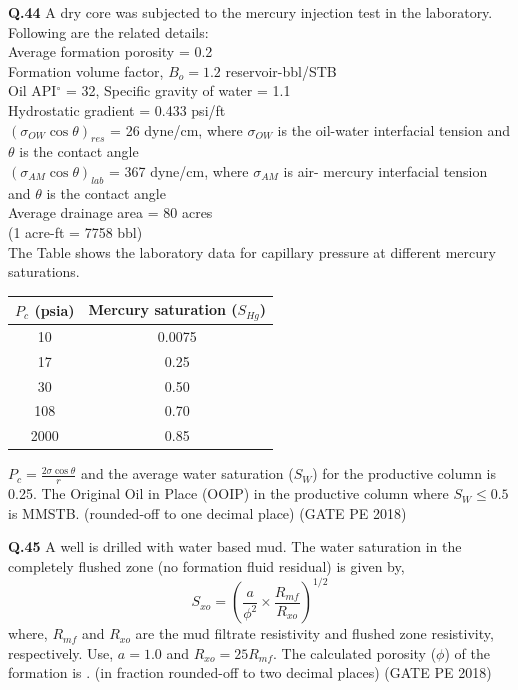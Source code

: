 \documentclass[journal,12pt,onecolumn]{IEEEtran}
\theoremstyle{remark}
\begin{document}
\noindent\textbf{Q.44} A dry core was subjected to the mercury injection test in the laboratory. Following are the related details: \\ 
Average formation porosity = 0.2 \\ 
Formation volume factor, $B_o = 1.2$ reservoir-bbl/STB \\ 
Oil API$^\circ$ = 32, Specific gravity of water = 1.1 \\ 
Hydrostatic gradient = 0.433 psi/ft \\ 
$(\sigma_{OW} \cos \theta)_{res}$ = 26 dyne/cm, where $\sigma_{OW}$ is the oil-water interfacial tension and $\theta$ is the contact angle \\ 
$(\sigma_{AM} \cos \theta)_{lab}$ = 367 dyne/cm, where $\sigma_{AM}$ is air- mercury interfacial tension and $\theta$ is the contact angle \\ 
Average drainage area = 80 acres \\ 
(1 acre-ft = 7758 bbl) \\ 

The Table shows the laboratory data for capillary pressure at different mercury saturations.

\vspace{0.3cm}
\begin{tabular}{|c|c|}
\hline
$P_c$ (psia) & Mercury saturation ($S_{Hg}$) \\
\hline
10 & 0.0075 \\
17 & 0.25 \\
30 & 0.50 \\
108 & 0.70 \\
2000 & 0.85 \\
\hline
\end{tabular}

\vspace{0.3cm}
$P_c = \frac{2\sigma \cos \theta}{r}$ and the average water saturation ($S_W$) for the productive column is 0.25. The Original Oil in Place (OOIP) in the productive column where $S_W \leq 0.5$ is \underline{\hspace{2cm}} MMSTB. (rounded-off to one decimal place) \hfill (GATE PE 2018)

\vspace{1cm}

\noindent\textbf{Q.45} A well is drilled with water based mud. The water saturation in the completely flushed zone (no formation fluid residual) is given by, 
\[ S_{xo} = \left( \frac{a}{\phi^2} \times \frac{R_{mf}}{R_{xo}} \right)^{1/2} \]
where, $R_{mf}$ and $R_{xo}$ are the mud filtrate resistivity and flushed zone resistivity, respectively. Use, $a = 1.0$ and $R_{xo} = 25 R_{mf}$. 
The calculated porosity ($\phi$) of the formation is \underline{\hspace{2cm}}. (in fraction rounded-off to two decimal places) \hfill (GATE PE 2018)
\end{document}
